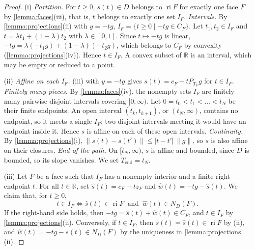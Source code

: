 \documentclass[11pt,a4paper]{article}
\numberwithin{equation}{section}
\theoremstyle{plain}
\theoremstyle{definition}
\theoremstyle{remark}
\newcommand{\R}{\mathbb{R}}
\newcommand{\ri}{\operatorname{ri}}
\newcommand{\Tend}{T_{\mathrm{end}}}
\begin{document}
\begin{proof}
(i) \emph{Partition.} For $t\ge0$, $s(t)\in D$ belongs to $\ri F$ for exactly one face $F$ by
\cref{lemma:faces}(iii), that is, $t$ belongs to exactly one set $I_F$. \emph{Intervals.} By
\cref{lemma:projections}(ii) with $y=-tg$, $I_F=\{t\ge0\mid-tg\in C_F\}$. Let
$t_1,t_2\in I_F$ and $t=\lambda t_1+(1-\lambda)t_2$ with $\lambda\in[0,1]$. Since $t\mapsto-tg$ is
linear, $-tg=\lambda(-t_1g)+(1-\lambda)(-t_2g)$, which belongs to $C_F$ by convexity
(\cref{lemma:projections}(iv)). Hence $t\in I_F$. A convex subset of $\R$ is an interval, which
may be empty or reduced to a point.

(ii) \emph{Affine on each $I_F$.} (iii) with $y=-tg$ gives
$s(t)=c_F-tP_{T_F}g$ for $t\in I_F$. \emph{Finitely many pieces.} By \cref{lemma:faces}(iv), the
nonempty sets $I_F$ are finitely many pairwise disjoint intervals covering $[0,\infty)$. Let
$0=t_0<t_1<\dots<t_N$ be their finite endpoints. An open interval $(t_k,t_{k+1})$, or
$(t_N,\infty)$, contains no endpoint, so it meets a single $I_F$: two disjoint intervals meeting
it would have an endpoint inside it. Hence $s$ is affine on each of these open intervals.
\emph{Continuity.} By \cref{lemma:projections}(i),
$\|s(t)-s(t')\|\le|t-t'|\,\|g\|$, so $s$ is also affine on their closures. \emph{End of the
path.} On $[t_N,\infty)$, $s$ is affine and bounded, since $D$ is bounded, so its slope
vanishes. We set $\Tend=t_N$.

(iii) Let $F$ be a face such that $I_F$ has a nonempty interior and a finite right endpoint
$\bar t$. For all $t\in\R$, set $\hat s(t)=c_F-tz_F$ and $\hat w(t)=-tg-\hat s(t)$. We claim
that, for $t\ge0$,
\[
  t\in I_F\iff \hat s(t)\in\ri F\ \text{ and }\ \hat w(t)\in N_D(F).
\]
If the right-hand side holds, then $-tg=\hat s(t)+\hat w(t)\in C_F$, and $t\in I_F$ by
\cref{lemma:projections}(ii). Conversely, if $t\in I_F$, then $s(t)=\hat s(t)\in\ri F$ by
(ii), and $\hat w(t)=-tg-s(t)\in N_D(F)$ by the uniqueness in \cref{lemma:projections}(ii).


\end{proof}
\end{document}
